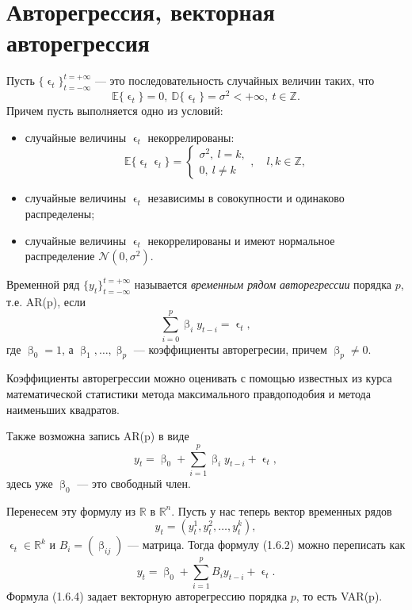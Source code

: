\documentclass[a4paper, 14pt]{extreport}
\numberwithin{equation}{subsection}
\newcommand{\Rm}{\mathbb{R}}
\newcommand{\Z}{\mathbb{Z}}
\renewcommand{\beta}{\upbeta}
\renewcommand{\epsilon}{\upvarepsilon}
\numberwithin{equation}{section}
\begin{document}
	\section{Авторегрессия, векторная авторегрессия}
	Пусть $\{\epsilon_t\}_{t=-\infty}^{t=+\infty}$ --- это последовательность случайных величин таких, что $$\mathbb{E}\{\epsilon_t\} = 0,\ \mathbb{D}\{\epsilon_t\} = \sigma^2 < +\infty,\ t\in \Z.$$ Причем пусть выполняется одно из условий:
	\begin{itemize}
		\item случайные величины $\epsilon_t$ некоррелированы: $$\mathbb E \{ \epsilon _t \epsilon_l\} = \begin{cases}\sigma^2,\ l = k,\\ 0,\ l \ne k\end{cases},\quad l,k \in \mathbb Z,$$
		\item случайные величины $\epsilon_t$ независимы в совокупности и одинаково распределены;
		\item случайные величины $\epsilon_t$ некоррелированы и имеют нормальное распределение $\mathcal{N}(0,\sigma^2)$.
	\end{itemize}
	Временной ряд $\{y_t\}_{t=-\infty}^{t=+\infty}$ называется \textit{временным рядом авторегрессии} порядка $p$, т.е. AR(p), если
	\begin{equation}
		\sum_{i=0}^{p} \beta_i y_{t-i}= \epsilon_t,
	\end{equation} где $\beta_0 = 1$, а $\beta_1,\ldots, \beta_p$ --- коэффициенты авторегресии, причем $\beta_p \ne 0$.
	
	Коэффициенты авторегрессии можно оценивать с помощью известных из курса математической статистики метода максимального правдоподобия и метода наименьших квадратов.
	
	Также возможна запись AR(p) в виде 
	\begin{equation}
		y_t = \beta_0 + \sum_{i=1}^{p} \beta_i y_{t-i}+ \epsilon_t,
	\end{equation} здесь уже $\beta_0$ --- это свободный член.
	
	Перенесем эту формулу из $\Rm$ в $\Rm^n$. Пусть у нас теперь вектор временных рядов 
	\begin{equation}
		y_t = (y_t^1, y_t^2,\ldots, y^k_t),
	\end{equation} $\epsilon_t\in \Rm^k$ и $B_i = (\beta_{ij})$ --- матрица. Тогда формулу (1.6.2) можно переписать как 
	\begin{equation}
	y_t = \beta_0 + \sum_{i=1}^{p}B_iy_{t-i} + \epsilon_t.
	\end{equation}
	Формула (1.6.4) задает векторную авторегрессию порядка $p$, то есть VAR(p). 
	
\end{document}
